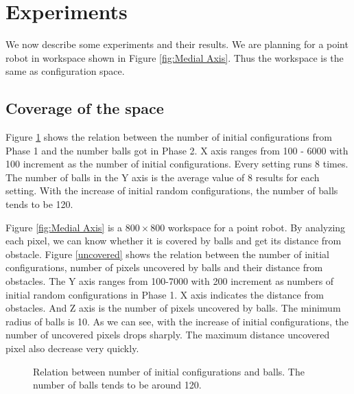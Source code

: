 \documentclass[11pt]{article}
\begin{document}
\section{Experiments}\label{experiments}
\indent\indent We now describe some experiments and their results. We are planning for a point robot in workspace shown in Figure \ref{fig:Medial Axis}. Thus the workspace is the same as configuration space. 

\subsection{Coverage of the space}

\indent\indent Figure \ref{PvB} shows the relation between the number of initial configurations from Phase 1 and the number balls got in Phase 2. X axis ranges from  100 - 6000 with 100 increment as the number of initial configurations. Every setting runs 8 times. The number of balls in the Y axis is the average value of 8 results for each setting. With the increase of initial random configurations, the number of balls tends to be 120. 

\indent Figure \ref{fig:Medial Axis} is a $800\times 800$ workspace for a point robot. By analyzing each pixel, we can know whether it is covered by balls and get its distance from obstacle. Figure \ref{uncovered} shows the relation between the number of initial configurations, number of pixels uncovered by balls and their distance from obstacles. The Y axis ranges from 100-7000 with 200 increment as numbers of initial random configurations in Phase 1. X axis indicates the distance from obstacles. And Z axis is the number of pixels uncovered by balls. The minimum radius of balls is 10. As we can see, with the increase of initial configurations, the number of uncovered pixels drops sharply. The maximum distance uncovered pixel also decrease very quickly.

\begin{figure}
	\caption{\label{PvB}} Relation between number of initial configurations and balls. The number of balls tends to be around 120.
\end{figure}
\end{document}
